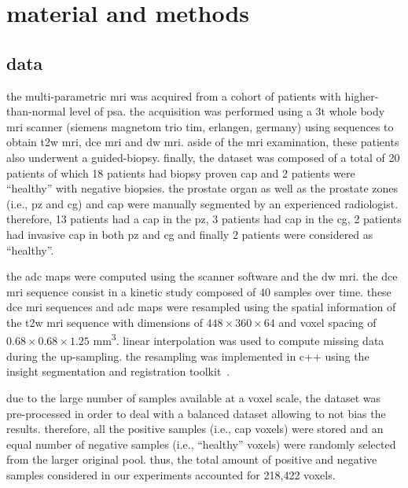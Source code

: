 \section{material and methods}\label{sec:methodology}

\subsection{data}\label{subsec:data}

the multi-parametric \ac{mri} was acquired from a cohort of patients with higher-than-normal level of \ac{psa}. the acquisition was performed using a 3t whole body \ac{mri} scanner (siemens magnetom trio tim, erlangen, germany) using sequences to obtain \ac{t2w} \ac{mri}, \ac{dce} \ac{mri} and \ac{dw} \ac{mri}. aside of the \ac{mri} examination, these patients also underwent a guided-biopsy. finally, the dataset was composed of a total of 20 patients of which 18 patients had biopsy proven \ac{cap} and 2 patients were ``healthy'' with negative biopsies. the prostate organ as well as the prostate zones (i.e., \ac{pz} and \ac{cg}) and \ac{cap} were manually segmented by an experienced radiologist. therefore, 13 patients had a \ac{cap} in the \ac{pz}, 3 patients had \ac{cap} in the \ac{cg}, 2 patients had invasive \ac{cap} in both \ac{pz} and \ac{cg} and finally 2 patients were considered as ``healthy''. 

the \ac{adc} maps were computed using the scanner software and the \ac{dw} \ac{mri}. the \ac{dce} \ac{mri} sequence consist in a kinetic study composed of 40 samples over time. these \ac{dce} \ac{mri} sequences and \ac{adc} maps were resampled using the spatial information of the \ac{t2w} \ac{mri} sequence with dimensions of $448 \times 360 \times 64$ and voxel spacing of $0.68 \times 0.68 \times 1.25 $ mm\textsuperscript{3}. linear interpolation was used to compute missing data during the up-sampling. the resampling was implemented in c++ using the insight segmentation and registration toolkit~\cite{johnson2013}.

due to the large number of samples available at a voxel scale, the dataset was pre-processed in order to deal with a balanced dataset allowing to not bias the results. therefore, all the positive samples (i.e., \ac{cap} voxels) were stored and an equal number of negative samples (i.e., ``healthy'' voxels) were randomly selected from the larger original pool. thus, the total amount of positive and negative samples considered in our experiments accounted for 218,422 voxels.

